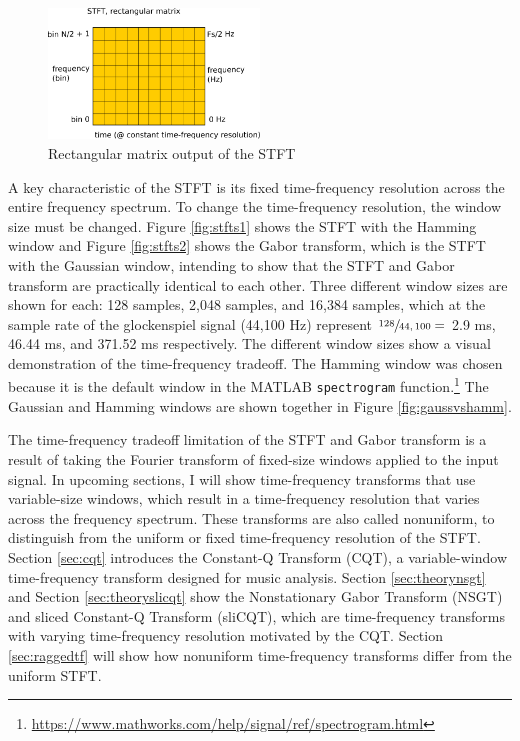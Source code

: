 \documentclass[report.tex]{subfiles}
\begin{document}
\begin{figure}[ht]
	\centering
	\includegraphics[width=0.5\textwidth]{./images-blockdiagrams/stft_diag.png}
	\caption{Rectangular matrix output of the STFT}
	\label{fig:stftdiag}
\end{figure}

A key characteristic of the STFT is its fixed time-frequency resolution across the entire frequency spectrum. To change the time-frequency resolution, the window size must be changed. Figure \ref{fig:stfts1} shows the STFT with the Hamming window and Figure \ref{fig:stfts2} shows the Gabor transform, which is the STFT with the Gaussian window, intending to show that the STFT and Gabor transform are practically identical to each other. Three different window sizes are shown for each: 128 samples, 2,048 samples, and 16,384 samples, which at the sample rate of the glockenspiel signal (44,100 Hz) represent $\sfrac{128}{44,100} =$ 2.9 ms, 46.44 ms, and 371.52 ms respectively. The different window sizes show a visual demonstration of the time-frequency tradeoff. The Hamming window was chosen because it is the default window in the MATLAB \Verb#spectrogram# function.\footnote{\url{https://www.mathworks.com/help/signal/ref/spectrogram.html}} The Gaussian and Hamming windows are shown together in Figure \ref{fig:gaussvshamm}.

The time-frequency tradeoff limitation of the STFT and Gabor transform is a result of taking the Fourier transform of fixed-size windows applied to the input signal. In upcoming sections, I will show time-frequency transforms that use variable-size windows, which result in a time-frequency resolution that varies across the frequency spectrum. These transforms are also called nonuniform, to distinguish from the uniform or fixed time-frequency resolution of the STFT. Section \ref{sec:cqt} introduces the Constant-Q Transform (CQT), a variable-window time-frequency transform designed for music analysis. Section \ref{sec:theorynsgt} and Section \ref{sec:theoryslicqt} show the Nonstationary Gabor Transform (NSGT) and sliced Constant-Q Transform (sliCQT), which are time-frequency transforms with varying time-frequency resolution motivated by the CQT. Section \ref{sec:raggedtf} will show how nonuniform time-frequency transforms differ from the uniform STFT.
\end{document}
